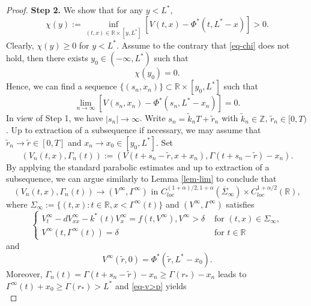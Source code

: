 \documentclass[10pt,a4paper]{amsart}
\begin{document}
\begin{proof}
 \textbf{ Step 2.} We show that for any $y<L^*$, 
 \begin{equation}\label{eq-chi}
  \chi (y):=\inf_{(t,x)\in\mathbb{R}\times[y,L^*]}[V(t,x)-\Phi^*(t,L^*-x)]>0.
 \end{equation}
Clearly, $\chi(y)\geq 0$ for $y<L^*$. Assume to the contrary that \eqref{eq-chi} does not hold,  then there exists  $y_0\in(-\infty,L^*)$ such that 
\begin{equation*}
  \chi(y_0)=0.
\end{equation*}
Hence, we can find a sequence $\{(s_n,x_n)\}\subset \mathbb{R}\times [y_0,L^*]$ such that 
\begin{equation*}
  \lim_{n\to\infty}[V(s_n,x_n)-\Phi^*(s_n,L^*-x_n)]=0.
\end{equation*}
In view of Step 1, we have $|s_n|\to\infty$. Write $s_n=\tilde{k}_nT+\tilde{r}_n$ with $\tilde{k}_n\in\mathbb Z$, $\tilde r_n\in [0, T)$. Up to extraction of a subsequence if necessary, we may assume that $\tilde{r}_n\to\tilde{r}\in[0,T]$ and $x_n\to x_0\in[y_0,L^*]$. Set 
\begin{equation*}
  (V_n(t,x), \Gamma_n(t)):=(V(t+s_n-\tilde{r},x+x_n),\Gamma(t+s_n-\tilde{r})-x_n).
\end{equation*} 
 By applying the standard parabolic estimates and up to extraction of a subsequence,  we can argue similarly  to  Lemma \ref{lem-lim} to conclude that 
 \begin{equation*}
  (V_n(t,x), \Gamma_n(t))\to (V^\infty,\Gamma^\infty) \text{ in }C_{loc}^{(1+\alpha)/2,1+\alpha}(\overline{\Sigma}_\infty)\times C_{loc}^{1+\alpha/2}(\mathbb{R}),
 \end{equation*}
 where ${\Sigma}_\infty:=\{(t,x):t\in\mathbb{R},x<\Gamma^\infty(t)\}$ and $(V^\infty,\Gamma^\infty)$ satisfies
\begin{equation}\label{eq-Vinf}\begin{cases}
  V^\infty_t-dV^\infty_{xx}-k^*(t)V^\infty_x=f(t,V^\infty), V^\infty>\delta &\text{ for }(t,x)\in{\Sigma}_\infty,\\
  V^\infty(t,\Gamma^\infty(t))=\delta &\text{ for }t\in\mathbb R
\end{cases}
\end{equation}
and 
\begin{equation}\label{eq-Vin}
  V^\infty(\tilde{r},0)=\Phi^*(\tilde{r}, L^*-x_0).
\end{equation}
Moreover, $\Gamma_n(t)=\Gamma(t+s_n-\tilde{r})-x_n\geq \Gamma(r_*)-x_n $ leads to
 $\Gamma^\infty(t)+x_0\geq \Gamma(r_*)>L^*$ and \eqref{eq-v>p} yields
\begin{equation*}

\end{equation*}
\end{proof}
\end{document}

